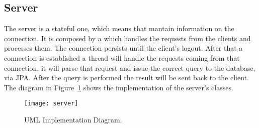 \subsection{Server}

The server is a stateful one, which means that mantain information on the
connection. It is composed by a  which handles the requests
from the clients and processes them. The connection persists until the client's
logout. After that a connection is established a thread will handle the requests
coming from that connection, it will parse that request and issue the correct
query to the database, via JPA\@. After the query is performed the result will
be sent back to the client. The diagram in Figure~\ref{fig:server} shows the
implementation of the server's classes.

\begin{landscape}
	\begin{figure}
		\texttt{[image: server]}
		\caption{ UML Implementation Diagram.}
		\label{fig:server}
	\end{figure}
\end{landscape}
